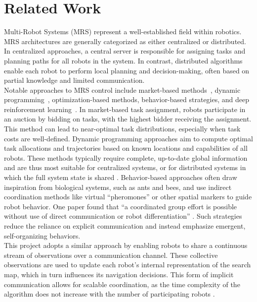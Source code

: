 \section{Related Work}
Multi-Robot Systems (MRS) represent a well-established field within robotics. MRS architectures are generally categorized as either centralized or distributed. In centralized approaches, a central server is responsible for assigning tasks and planning paths for all robots in the system. 
In contrast, distributed algorithms enable each robot to perform local planning and decision-making, often based on partial knowledge and limited communication. \\

Notable approaches to MRS control include market-based methods~\cite{trigui2014market}, dynamic programming~\cite{kato2011dp}, optimization-based methods, behavior-based strategies, and deep reinforcement learning~\cite{huttenrauch2019deep-swarm}. In market-based task assignment, robots participate in an auction by bidding on tasks, with the highest bidder receiving the assignment. This method can lead to near-optimal task distributions, especially when task costs are well-defined. Dynamic programming approaches aim to compute optimal task allocations and trajectories based on known locations and capabilities of all robots. These methods typically require complete, up-to-date global information and are thus most suitable for centralized systems, or for distributed systems in which the full system state is shared \cite{multi-robot-search-moving-target}. Behavior-based approaches often draw inspiration from biological systems, such as ants and bees, and use indirect coordination methods like virtual “pheromones” or other spatial markers to guide robot behavior. One paper found that “a coordinated group effort is possible without use of direct communication or robot differentiation” \cite{kube2000cooperative-ants}. Such strategies reduce the reliance on explicit communication and instead emphasize emergent, self-organizing behaviors. \\

This project adopts a similar approach by enabling robots to share a continuous stream of observations over a communication channel. These collective observations are used to update each robot’s internal representation of the search map, which in turn influences its navigation decisions. This form of implicit communication allows for scalable coordination, as the time complexity of the algorithm does not increase with the number of participating robots \cite{multi-robot-search-moving-target}.\\

